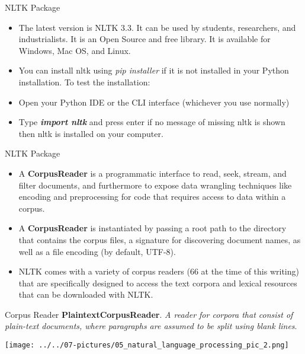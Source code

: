 \documentclass[11pt]{beamer}
\begin{document}
\begin{frame}{NLTK Package}
	\begin{itemize}
		\item The latest version is NLTK 3.3. It can be used by students, researchers, and industrialists. It is an Open Source and free library. It is available for Windows, Mac OS, and Linux. 
		\item You can install nltk using \textit{pip installer} if it is not installed in your Python installation. To test the installation:
		\item Open your Python IDE or the CLI interface (whichever you use normally)
		\item Type \textbf{\textit{import nltk}} and press enter if no message of missing nltk is shown then nltk is installed on your computer.
	\end{itemize}
\end{frame}
\begin{frame}{NLTK Package}
	\begin{itemize}
		\item A \textbf{CorpusReader} is a programmatic interface to read, seek, stream, and filter documents, and furthermore to expose data wrangling techniques like encoding and preprocessing for code that requires access to data within a corpus. 
		\item A \textbf{CorpusReader} is instantiated by passing a root path to the directory that contains the corpus files, a signature for discovering document names, as well as a file encoding (by default, UTF-8).
		\item NLTK comes with a variety of corpus readers (66 at the time of this writing) that are specifically designed to access the text corpora and lexical resources that can be downloaded with NLTK.
	\end{itemize}
\end{frame}
\begin{frame}{Corpus Reader}
	\textbf{PlaintextCorpusReader}. \textit{A reader for corpora that consist of plain-text documents, where paragraphs are assumed to be split using blank lines}.
	\begin{center}
	\texttt{[image: ../../07-pictures/05\_natural\_language\_processing\_pic\_2.png]}
	\end{center}
\end{frame}
\end{document}
